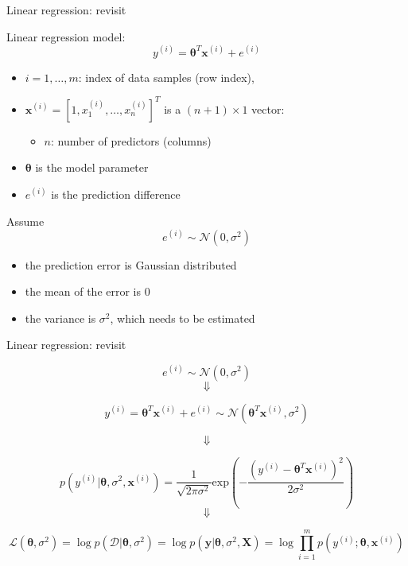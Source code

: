 \documentclass[ignorenonframetext,]{beamer}
\providecommand{\tightlist}{%
  \setlength{\itemsep}{0pt}\setlength{\parskip}{0pt}}
\newcommand{\normal}[2]{\ensuremath{\mathcal{N}\left (#1,#2 \right )}}
\newcommand{\vv}[1]{\boldsymbol{#1}}
\newcommand{\di}[2]{\ensuremath{ #1^{(#2)}}}
\begin{document}
\begin{frame}{Linear regression: revisit}
\protect\hypertarget{linear-regression-revisit}{}

Linear regression model:
\[y^{(i)} =\vv{\theta}^T\vv{x}^{(i)}  + e^{(i)}\]

\begin{itemize}
\tightlist
\item
  \(i = 1,\ldots,m\): index of data samples (row index),
\item
  \(\vv{x}^{(i)} = [1, x_{1}^{(i)}, \ldots, x^{(i)}_n]^T\) is a
  \((n+1) \times 1\) vector:

  \begin{itemize}
  \tightlist
  \item
    \(n\): number of predictors (columns)
  \end{itemize}
\item
  \(\vv{\theta}\) is the model parameter
\item
  \(e^{(i)}\) is the prediction difference
\end{itemize}

Assume \[\di{e}{i} \sim \normal{0}{\sigma^2}\]

\begin{itemize}
\tightlist
\item
  the prediction error is Gaussian distributed
\item
  the mean of the error is \(0\)
\item
  the variance is \(\sigma^2\), which needs to be estimated
\end{itemize}

\end{frame}

\begin{frame}{Linear regression: revisit}
\protect\hypertarget{linear-regression-revisit-1}{}

\[\di{e}{i}  \sim \normal{0}{\sigma^2}\] \[\Downarrow\]

\[\di{y}{i}=\vv{\theta}^{T} \di{\vv{x}}{i} + \di{e}{i}  \sim \normal{\vv{\theta}^{T} \di{\vv{x}}{i}}{\sigma^2}\]

\[\Downarrow\]

\[p(\di{y}{i}|\vv{\theta},\sigma^2, \di{\vv{x}}{i}) = \frac{1}{\sqrt{2\pi\sigma^2}}\text{exp}\left(-\frac{(\di{y}{i}-\vv{\theta}^T\di{\vv{x}}{i})^2}{2\sigma^2}\right)\]
\[\Downarrow\]

\[\mathcal{L}(\vv{\theta},\sigma^2) = \log p(\mathcal{D} |\vv{\theta}, \sigma^2) = \log p(\vv{y} |\vv{\theta},\sigma^2,\vv{X})= \log \prod_{i=1}^m p(\di{y}{i};\vv{\theta},\di{\vv{x}}{i})\]

\end{frame}
\end{document}
